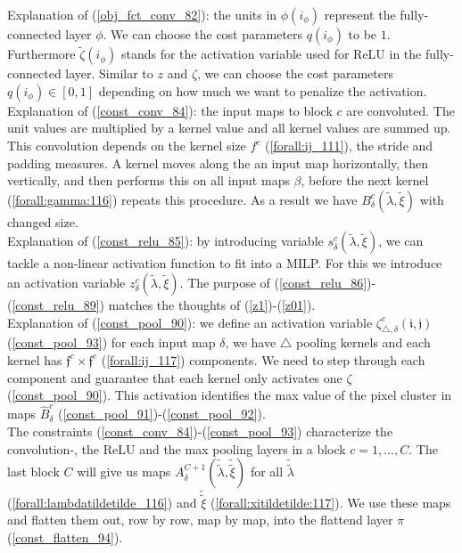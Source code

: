 \documentclass{article}
\begin{document}
{Explanation of (\ref{obj_fct_conv_82}): the units in $\phi(i_\phi)$ represent the fully-connected layer $\phi$. We can choose the cost parameters $q(i_\phi)$ to be $1$. Furthermore $\tilde{\zeta}(i_\phi)$ stands for the activation variable used for ReLU in the fully-connected layer. Similar to $z$ and $\zeta$, we can choose the cost parameters $q(i_\phi) \in [0,1]$ depending on how much we want to penalize the activation.\\
Explanation of (\ref{const_conv_84}): the input maps to block $c$ are convoluted. The unit values are multiplied by a kernel value and all kernel values are summed up. This convolution depends on the kernel size $f^c$ (\ref{forall:ij_111}), the stride and padding measures. A kernel moves along the an input map horizontally, then vertically, and then performs this on all input maps $\beta$, before the next kernel (\ref{forall:gamma:116}) repeats this procedure. As a result we have $B_\delta^c(\tilde{\lambda}, \tilde{\xi})$ with changed size. \\
Explanation of (\ref{const_relu_85}): by introducing variable $s_\delta^c(\tilde{\lambda}, \tilde{\xi})$, we can tackle a non-linear activation function to fit into a MILP. For this we introduce an activation variable $z_\delta^c(\tilde{\lambda}, \tilde{\xi})$. The purpose of (\ref{const_relu_86})-(\ref{const_relu_89}) matches the thoughts of (\ref{z1})-(\ref{z01}).\\
Explanation of (\ref{const_pool_90}): we define an activation variable $\zeta_{\triangle, \delta}^c(\mathfrak{i}, \mathfrak{j})$ (\ref{const_pool_93}) for each input map $\delta$, we have $\triangle$ pooling kernels and each kernel has $\mathfrak{f}^c \times \mathfrak{f}^c$ (\ref{forall:ij_117}) components. We need to step through each component and guarantee that each kernel only activates one $\zeta$ (\ref{const_pool_90}). This activation identifies the max value of the pixel cluster in maps $\hat{B}_\delta^c$ (\ref{const_pool_91})-(\ref{const_pool_92}).\\
The constraints (\ref{const_conv_84})-(\ref{const_pool_93}) characterize the convolution-, the ReLU and the max pooling layers in a block $c=1, \ldots, C$. The last block $C$ will give us maps $A_\delta^{C+1}(\tilde{\tilde{\lambda}}, \tilde{\tilde{\xi}})$ for all $\tilde{\tilde{\lambda}}$ (\ref{forall:lambdatildetilde_116}) and $\tilde{\tilde{\xi}}$ (\ref{forall:xitildetilde:117}). We use these maps and flatten them out, row by row, map by map, into the flattend layer $\pi$ (\ref{const_flatten_94}). \\
}
\end{document}
